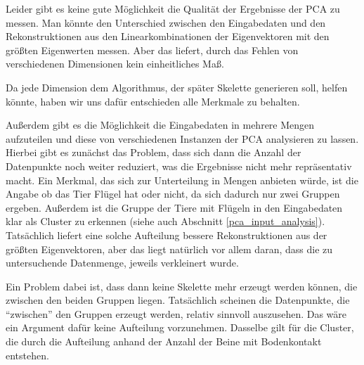  Leider gibt es keine gute Möglichkeit die Qualität der Ergebnisse der PCA zu messen. Man könnte den Unterschied zwischen den Eingabedaten und den Rekonstruktionen aus den Linearkombinationen der Eigenvektoren mit den größten Eigenwerten messen. Aber das liefert, durch das Fehlen von verschiedenen Dimensionen kein einheitliches Maß.
 
 Da jede Dimension dem Algorithmus, der später Skelette generieren soll, helfen könnte, haben wir uns dafür entschieden alle Merkmale zu behalten.
 
 Außerdem gibt es die Möglichkeit die Eingabedaten in mehrere Mengen aufzuteilen und diese von verschiedenen Instanzen der PCA analysieren zu lassen. Hierbei gibt es zunächst das Problem, dass sich dann die Anzahl der Datenpunkte noch weiter reduziert, was die Ergebnisse nicht mehr repräsentativ macht.
 Ein Merkmal, das sich zur Unterteilung in Mengen anbieten würde, ist die Angabe ob das Tier Flügel hat oder nicht, da sich dadurch nur zwei Gruppen ergeben. Außerdem ist die Gruppe der Tiere mit Flügeln in den Eingabedaten klar als Cluster zu erkennen (siehe auch Abschnitt \ref{pca_input_analysis}). Tatsächlich liefert eine solche Aufteilung bessere Rekonstruktionen aus der größten Eigenvektoren, aber das liegt natürlich vor allem daran, dass die zu untersuchende Datenmenge, jeweils verkleinert wurde.
 
 Ein Problem dabei ist, dass dann keine Skelette mehr erzeugt werden können, die zwischen den beiden Gruppen liegen. Tatsächlich scheinen die Datenpunkte, die "`zwischen"' den Gruppen erzeugt werden, relativ sinnvoll auszusehen. 
 Das wäre ein Argument dafür keine Aufteilung vorzunehmen. Dasselbe gilt für die Cluster, die durch die Aufteilung anhand der Anzahl der Beine mit Bodenkontakt entstehen.
 

